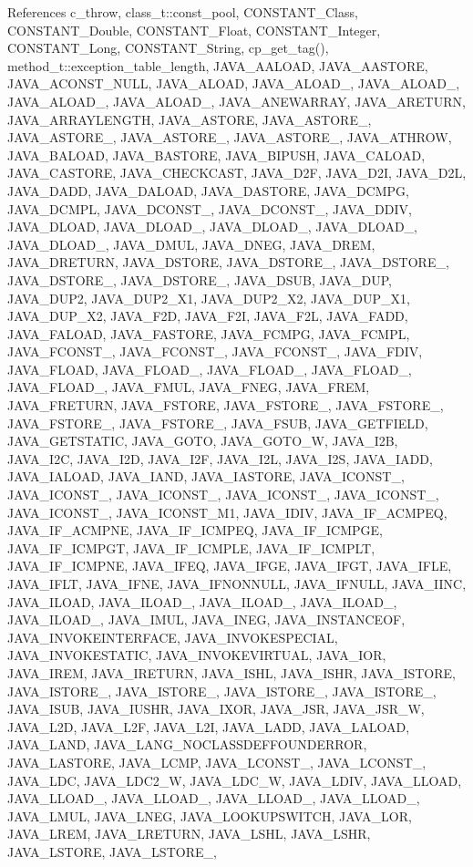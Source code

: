 References c\_\-throw, class\_\-t::const\_\-pool, CONSTANT\_\-Class, CONSTANT\_\-Double, CONSTANT\_\-Float, CONSTANT\_\-Integer, CONSTANT\_\-Long, CONSTANT\_\-String, cp\_\-get\_\-tag(), method\_\-t::exception\_\-table\_\-length, JAVA\_\-AALOAD, JAVA\_\-AASTORE, JAVA\_\-ACONST\_\-NULL, JAVA\_\-ALOAD, JAVA\_\-ALOAD\_, JAVA\_\-ALOAD\_, JAVA\_\-ALOAD\_, JAVA\_\-ALOAD\_, JAVA\_\-ANEWARRAY, JAVA\_\-ARETURN, JAVA\_\-ARRAYLENGTH, JAVA\_\-ASTORE, JAVA\_\-ASTORE\_, JAVA\_\-ASTORE\_, JAVA\_\-ASTORE\_, JAVA\_\-ASTORE\_, JAVA\_\-ATHROW, JAVA\_\-BALOAD, JAVA\_\-BASTORE, JAVA\_\-BIPUSH, JAVA\_\-CALOAD, JAVA\_\-CASTORE, JAVA\_\-CHECKCAST, JAVA\_\-D2F, JAVA\_\-D2I, JAVA\_\-D2L, JAVA\_\-DADD, JAVA\_\-DALOAD, JAVA\_\-DASTORE, JAVA\_\-DCMPG, JAVA\_\-DCMPL, JAVA\_\-DCONST\_, JAVA\_\-DCONST\_, JAVA\_\-DDIV, JAVA\_\-DLOAD, JAVA\_\-DLOAD\_, JAVA\_\-DLOAD\_, JAVA\_\-DLOAD\_, JAVA\_\-DLOAD\_, JAVA\_\-DMUL, JAVA\_\-DNEG, JAVA\_\-DREM, JAVA\_\-DRETURN, JAVA\_\-DSTORE, JAVA\_\-DSTORE\_, JAVA\_\-DSTORE\_, JAVA\_\-DSTORE\_, JAVA\_\-DSTORE\_, JAVA\_\-DSUB, JAVA\_\-DUP, JAVA\_\-DUP2, JAVA\_\-DUP2\_\-X1, JAVA\_\-DUP2\_\-X2, JAVA\_\-DUP\_\-X1, JAVA\_\-DUP\_\-X2, JAVA\_\-F2D, JAVA\_\-F2I, JAVA\_\-F2L, JAVA\_\-FADD, JAVA\_\-FALOAD, JAVA\_\-FASTORE, JAVA\_\-FCMPG, JAVA\_\-FCMPL, JAVA\_\-FCONST\_, JAVA\_\-FCONST\_, JAVA\_\-FCONST\_, JAVA\_\-FDIV, JAVA\_\-FLOAD, JAVA\_\-FLOAD\_, JAVA\_\-FLOAD\_, JAVA\_\-FLOAD\_, JAVA\_\-FLOAD\_, JAVA\_\-FMUL, JAVA\_\-FNEG, JAVA\_\-FREM, JAVA\_\-FRETURN, JAVA\_\-FSTORE, JAVA\_\-FSTORE\_, JAVA\_\-FSTORE\_, JAVA\_\-FSTORE\_, JAVA\_\-FSTORE\_, JAVA\_\-FSUB, JAVA\_\-GETFIELD, JAVA\_\-GETSTATIC, JAVA\_\-GOTO, JAVA\_\-GOTO\_\-W, JAVA\_\-I2B, JAVA\_\-I2C, JAVA\_\-I2D, JAVA\_\-I2F, JAVA\_\-I2L, JAVA\_\-I2S, JAVA\_\-IADD, JAVA\_\-IALOAD, JAVA\_\-IAND, JAVA\_\-IASTORE, JAVA\_\-ICONST\_, JAVA\_\-ICONST\_, JAVA\_\-ICONST\_, JAVA\_\-ICONST\_, JAVA\_\-ICONST\_, JAVA\_\-ICONST\_, JAVA\_\-ICONST\_\-M1, JAVA\_\-IDIV, JAVA\_\-IF\_\-ACMPEQ, JAVA\_\-IF\_\-ACMPNE, JAVA\_\-IF\_\-ICMPEQ, JAVA\_\-IF\_\-ICMPGE, JAVA\_\-IF\_\-ICMPGT, JAVA\_\-IF\_\-ICMPLE, JAVA\_\-IF\_\-ICMPLT, JAVA\_\-IF\_\-ICMPNE, JAVA\_\-IFEQ, JAVA\_\-IFGE, JAVA\_\-IFGT, JAVA\_\-IFLE, JAVA\_\-IFLT, JAVA\_\-IFNE, JAVA\_\-IFNONNULL, JAVA\_\-IFNULL, JAVA\_\-IINC, JAVA\_\-ILOAD, JAVA\_\-ILOAD\_, JAVA\_\-ILOAD\_, JAVA\_\-ILOAD\_, JAVA\_\-ILOAD\_, JAVA\_\-IMUL, JAVA\_\-INEG, JAVA\_\-INSTANCEOF, JAVA\_\-INVOKEINTERFACE, JAVA\_\-INVOKESPECIAL, JAVA\_\-INVOKESTATIC, JAVA\_\-INVOKEVIRTUAL, JAVA\_\-IOR, JAVA\_\-IREM, JAVA\_\-IRETURN, JAVA\_\-ISHL, JAVA\_\-ISHR, JAVA\_\-ISTORE, JAVA\_\-ISTORE\_, JAVA\_\-ISTORE\_, JAVA\_\-ISTORE\_, JAVA\_\-ISTORE\_, JAVA\_\-ISUB, JAVA\_\-IUSHR, JAVA\_\-IXOR, JAVA\_\-JSR, JAVA\_\-JSR\_\-W, JAVA\_\-L2D, JAVA\_\-L2F, JAVA\_\-L2I, JAVA\_\-LADD, JAVA\_\-LALOAD, JAVA\_\-LAND, JAVA\_\-LANG\_\-NOCLASSDEFFOUNDERROR, JAVA\_\-LASTORE, JAVA\_\-LCMP, JAVA\_\-LCONST\_, JAVA\_\-LCONST\_, JAVA\_\-LDC, JAVA\_\-LDC2\_\-W, JAVA\_\-LDC\_\-W, JAVA\_\-LDIV, JAVA\_\-LLOAD, JAVA\_\-LLOAD\_, JAVA\_\-LLOAD\_, JAVA\_\-LLOAD\_, JAVA\_\-LLOAD\_, JAVA\_\-LMUL, JAVA\_\-LNEG, JAVA\_\-LOOKUPSWITCH, JAVA\_\-LOR, JAVA\_\-LREM, JAVA\_\-LRETURN, JAVA\_\-LSHL, JAVA\_\-LSHR, JAVA\_\-LSTORE, JAVA\_\-LSTORE\_, 